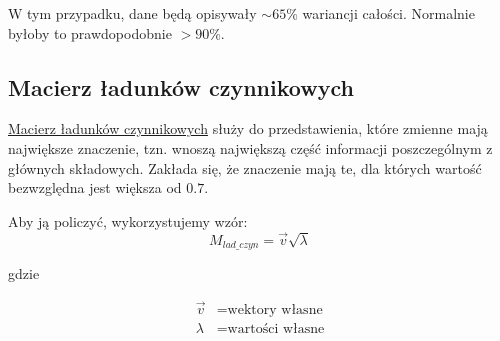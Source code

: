 \documentclass[12pt, a4paper]{article}
\begin{document}
        W tym przypadku, dane będą opisywały $\sim 65\%$ wariancji całości. Normalnie byłoby to prawdopodobnie $>90\%$.
        
    \subsection{Macierz ładunków czynnikowych}
        
        \href{file:./graphics/m_lad.png}{Macierz ładunków czynnikowych} służy do przedstawienia, które zmienne mają największe znaczenie, tzn. wnoszą największą część
        informacji poszczególnym z głównych składowych. Zakłada się, że znaczenie mają te, dla których wartość bezwzględna jest większa od $0.7$.

        Aby ją policzyć, wykorzystujemy wzór:
        \begin{equation}
            M_{lad\_czyn} = \overrightarrow{v} \sqrt{\lambda}
        \end{equation}

        gdzie

        \begin{align*}
            \overrightarrow{v} &= \text{wektory własne}\\
            \lambda &= \text{wartości własne}
        \end{align*}
\end{document}

